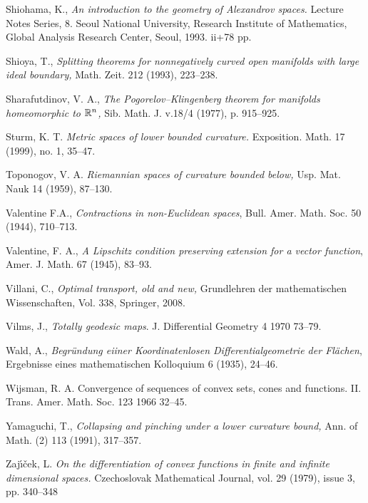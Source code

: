\begin{thebibliography}{52}
Shiohama, K., \textit{An introduction to the geometry of
Alexandrov spaces.} Lecture Notes Series, 8. Seoul National University, Research
Institute of Mathematics, Global Analysis Research Center, Seoul, 1993. ii+78
pp.

  Shioya, T., \textit{Splitting theorems for nonnegatively curved open manifolds with large ideal boundary,} Math. Zeit. 212 (1993), 223--238.

Sharafutdinov, V. A., 
\textit{The Pogorelov--Klingenberg theorem for manifolds homeomorphic to $\mathbb{R}^n$,} 
Sib. Math. J. v.18/4 (1977), p. 915--925.

Sturm, K. T. \textit{Metric spaces of lower bounded curvature.}  
Exposition. Math.  17  (1999),  no. 1, 35--47.

  Toponogov, V. A. \textit{Riemannian spaces of curvature bounded below,} Usp. Mat. Nauk 14 (1959), 87--130.

 Valentine F.A., 
\textit{Contractions in non-Euclidean spaces}, Bull. Amer. Math. Soc. 50 (1944), 710--713.

 Valentine, F. A., 
\textit{A Lipschitz condition preserving extension for a vector
function}, Amer. J. Math. 67 (1945), 83--93.

 Villani, C., \textit{Optimal transport, old and new,} Grundlehren der mathematischen Wissenschaften, Vol. 338, Springer, 2008.

 Vilms, J., \textit{Totally geodesic maps}.
J. Differential Geometry 4 1970 73--79. 

 Wald, A., \textit{Begr\"undung eiiner Koordinatenlosen Differentialgeometrie der Fl\"achen}, Ergebnisse eines mathematischen Kolloquium
6  (1935), 24--46.



 Wijsman, R. A. Convergence of sequences of convex sets, cones and functions. II. Trans. Amer. Math. Soc. 123 1966 32--45.

 Yamaguchi, T., \textit{Collapsing and pinching under a lower curvature
bound,} Ann. of Math. (2) 113 (1991), 317--357.

 Zaj\'{\i}\v{c}ek, L. \textit{On the differentiation of convex functions in finite and infinite dimensional spaces.} Czechoslovak Mathematical Journal, vol. 29 (1979), issue 3, pp. 340--348
\end{thebibliography}